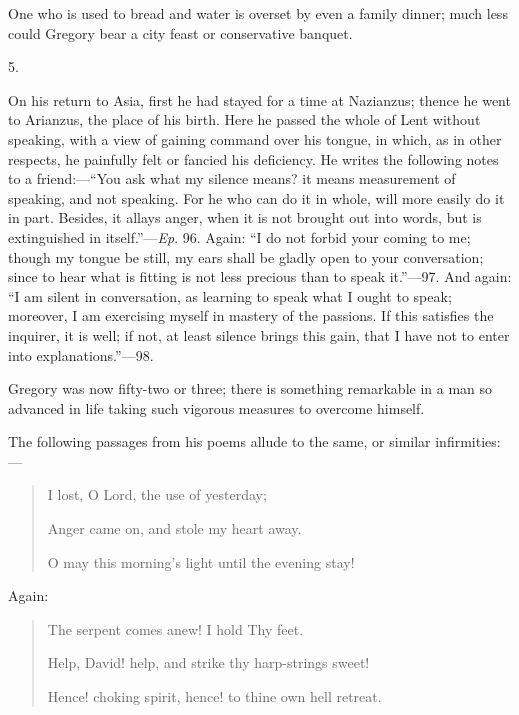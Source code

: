 One who is used to bread and water is overset by even a family
dinner; much less could Gregory bear a city feast or conservative
banquet.

5.

On his return to Asia, first he had stayed for a time at Nazianzus;
thence he went to Arianzus, the place of his birth. Here he passed the
whole of Lent without speaking, with a view of gaining command over
his tongue, in which, as in other respects, he painfully felt or
fancied his deficiency. He writes the following notes to a friend:—``You
ask what my silence means? it means measurement of speaking, and not
speaking. For he who can do it in whole, will more easily do it in
part. Besides, it allays anger, when it is not brought out into words,
but is extinguished in itself.''—\emph{Ep}. 96. Again: ``I
do not forbid your coming to me; though my tongue be still, my ears
shall be gladly open to your conversation; since to hear what is
fitting is not less precious than to speak it.''—97. And again:
``I am silent in conversation, as learning to speak what I ought
to speak; moreover, I am exercising myself in mastery of the passions.
If this satisfies the inquirer, it is well; if not, at least silence
brings this gain, that I have not to enter into explanations.''—98.

Gregory was now fifty-two or three; there is something remarkable
in a man so advanced in life taking such vigorous measures to overcome
himself.

The following passages from his poems allude to the same, or
similar infirmities:—

\begin{quote}

I lost, O Lord, the use of yesterday;

Anger came on, and stole my heart away.

O may this morning's light until the evening stay!

\end{quote}

Again:

\begin{quote}

The serpent comes anew! I hold Thy feet.

Help, David! help, and strike thy harp-strings sweet!

Hence! choking spirit, hence! to thine own hell retreat.

\end{quote}


